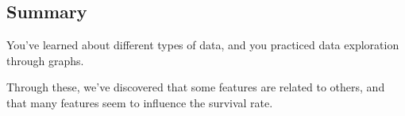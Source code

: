 \documentclass[11pt]{article}
\begin{document}
\hypertarget{summary}{%
\subsection{Summary}\label{summary}}

You've learned about different types of data, and you practiced data
exploration through graphs.

Through these, we've discovered that some features are related to
others, and that many features seem to influence the survival rate.


    
    
    
\end{document}
